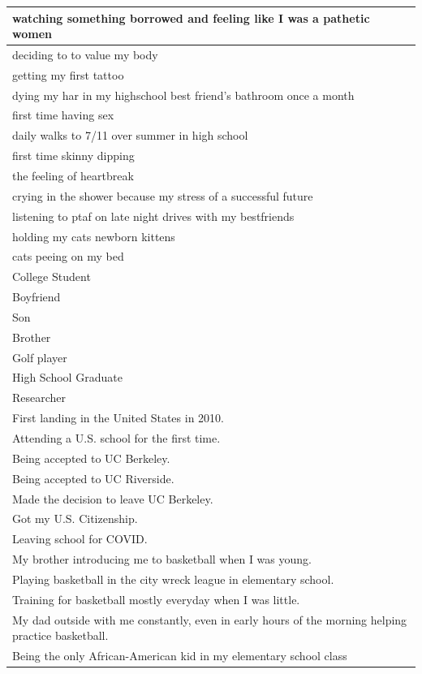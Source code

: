 \documentclass[
  .7em,
  letterpaper,
  DIV=11,
  numbers=noendperiod]{scrartcl}
\begin{document}
\begin{table}
\begin{tabular}{l}
\hline
watching something borrowed and feeling like I was a pathetic women\\
\hline
deciding to to value my body\\
\hline
getting my first tattoo\\
\hline
dying my har in my highschool best friend's bathroom once a month\\
\hline
first time having sex\\
\hline
daily walks to 7/11 over summer in high school\\
\hline
first time skinny dipping\\
\hline
the feeling of heartbreak\\
\hline
crying in the shower because my stress of a successful future\\
\hline
listening to ptaf on late night drives with my bestfriends\\
\hline
holding my cats newborn kittens\\
\hline
cats peeing on my bed\\
\hline
College Student\\
\hline
Boyfriend\\
\hline
Son\\
\hline
Brother\\
\hline
Golf player\\
\hline
High School Graduate\\
\hline
Researcher\\
\hline
First landing in the United States in 2010.\\
\hline
Attending a U.S. school for the first time.\\
\hline
Being accepted to UC Berkeley.\\
\hline
Being accepted to UC Riverside.\\
\hline
Made the decision to leave UC Berkeley.\\
\hline
Got my U.S. Citizenship.\\
\hline
Leaving school for COVID.\\
\hline
My brother introducing me to basketball when I was young.\\
\hline
Playing basketball in the city wreck league in elementary school.\\
\hline
Training for basketball mostly everyday when I was little.\\
\hline
My dad outside with me constantly, even in early hours of the morning helping practice basketball.\\
\hline
Being the only African-American kid in my elementary school class\\

\end{tabular}
\end{table}
\end{document}
